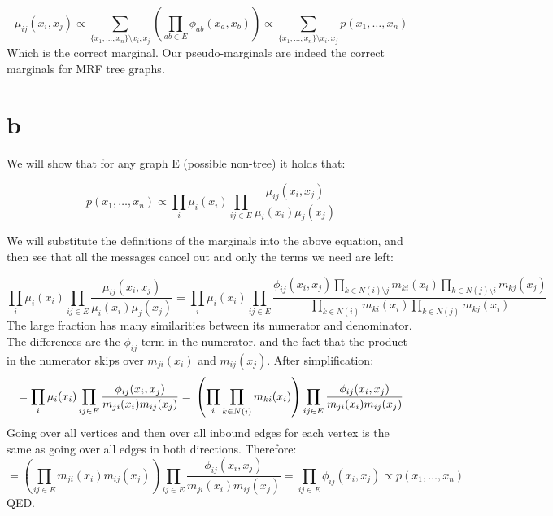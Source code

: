 \documentclass[11pt]{article}
\begin{document}
\begin{equation}
\mu_{ij}(x_i, x_j) \propto \sum_{\{x_1,\ldots,x_n\}\setminus x_i,x_j} \left( \prod_{ab \in E} \phi_{ab}(x_a,x_b) \right) \propto \sum_{\{x_1,\ldots,x_n\}\setminus x_i,x_j} p(x_1,\ldots,x_n)
\end{equation}
Which is the correct marginal. Our pseudo-marginals are indeed the correct marginals for MRF tree graphs.

\section*{b}

We will show that for any graph E (possible non-tree) it holds that:

\begin{equation}
p(x_1,\ldots,x_n) \propto \prod_{i} \mu_{i}(x_i) \prod_{ij \in E} \frac{\mu_{ij}(x_i, x_j)}{\mu_{i}(x_i) \mu_{j}(x_j)}
\end{equation}

We will substitute the definitions of the marginals into the above equation, and then see that all the messages cancel out and only the terms we need are left:

\begin{equation}
\prod_{i} \mu_{i}(x_i) \prod_{ij \in E} \frac{\mu_{ij}(x_i, x_j)}{\mu_{i}(x_i) \mu_{j}(x_j)}
= \prod_{i} \mu_{i}(x_i) \prod_{ij \in E} \frac
{\phi_{ij}(x_i,x_j) \prod_{k \in N(i) \setminus j} m_{ki}(x_i) \prod_{k \in N(j) \setminus i} m_{kj}(x_j)}
{\prod_{k \in N(i)} m_{ki}(x_i) \prod_{k \in N(j)} m_{kj}(x_i)}
\end{equation}
The large fraction has many similarities between its numerator and denominator.
The differences are the $\phi_{ij}$ term in the numerator, and the fact that the product in the
numerator skips over $m_{ji}(x_i)$ and $m_{ij}(x_j)$. After simplification:
\begin{equation}
=\prod_{i} \mu_{i}(x_i) \prod_{ij \in E} \frac
{\phi_{ij}(x_i,x_j)}
{m_{ji}(x_i) m_{ij}(x_j)}
= \\
\left( \prod_{i} \prod_{k \in N(i)} m_{ki}(x_i) \right) \prod_{ij \in E} \frac
{\phi_{ij}(x_i,x_j)}
{m_{ji}(x_i) m_{ij}(x_j)}
\end{equation}
Going over all vertices and then over all inbound edges for each vertex is the same as going over all edges in both directions. Therefore:
\begin{equation}
= \left( \prod_{ij \in E} m_{ji}(x_i) m_{ij}(x_j) \right) \prod_{ij \in E} \frac
{\phi_{ij}(x_i,x_j)}
{m_{ji}(x_i) m_{ij}(x_j)} = \prod_{ij \in E} \phi_{ij}(x_i,x_j) \propto p(x_1,\ldots,x_n)
\end{equation}
QED.
\end{document}
